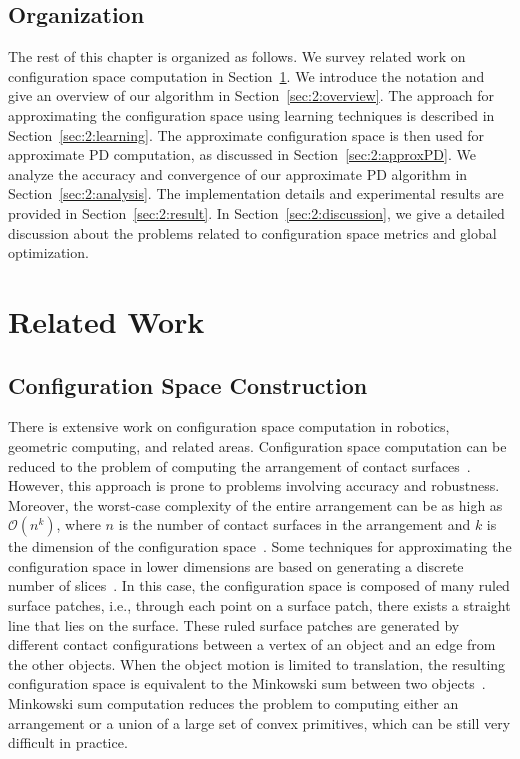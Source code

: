 \subsection{Organization}
The rest of this chapter is organized as follows. We survey related work on configuration space computation in Section~\ref{sec:2:related}. We introduce the notation and give an overview of our algorithm in Section~\ref{sec:2:overview}. The approach for approximating the configuration space using learning techniques is described in Section~\ref{sec:2:learning}. The approximate configuration space is then used for approximate PD computation, as discussed in Section~\ref{sec:2:approxPD}. We analyze the accuracy and convergence of our approximate PD algorithm in Section~\ref{sec:2:analysis}. The implementation details and experimental results are provided in Section~\ref{sec:2:result}. In Section~\ref{sec:2:discussion}, we give a detailed discussion about the problems related to configuration space metrics and global optimization. 

\section{Related Work}
\label{sec:2:related}
\subsection{Configuration Space Construction}
There is extensive work on configuration space computation in robotics, geometric computing, and related areas.
Configuration space computation can be reduced to the problem of computing the arrangement of contact surfaces~\cite{Varadhan:2006:TPA}.
However, this approach is prone to problems involving accuracy and robustness. Moreover, the worst-case complexity of the entire arrangement can be as high as $\mathcal O(n^k)$, where $n$ is the number of contact surfaces in the arrangement and $k$ is the dimension of the configuration space~\cite{Goodman:Rourke:1997}. Some techniques for approximating the configuration space in lower dimensions are based on generating a discrete number of slices~\cite{Sacks:SCS:1997}. In this case, the configuration space is composed of many ruled surface patches, i.e., through each point on a surface patch, there exists a straight line that lies on the surface. These ruled surface patches are generated by different contact configurations between a vertex of an object and an edge from the other objects. When the object motion is limited to translation, the resulting configuration space is equivalent to the Minkowski sum between two objects~\cite{Leonidas:CCRS:1987,LPT:SpatialPlanning:1983}. Minkowski sum computation reduces the problem to computing either an arrangement or a union of a large set of convex primitives, which can be still very difficult in practice.

